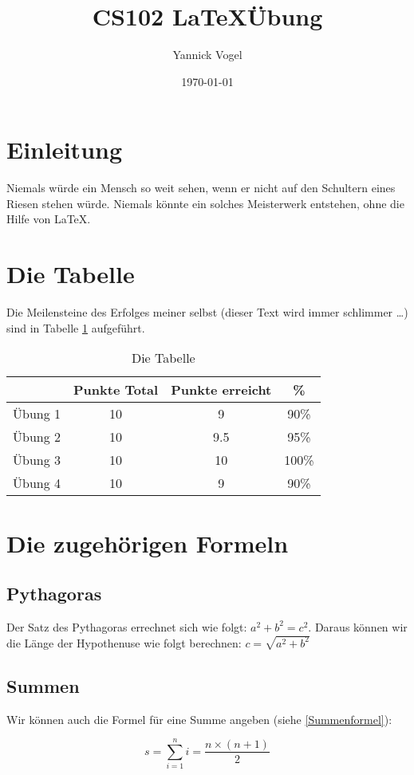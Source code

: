 \documentclass[11pt,a4paper]{article}
\date{\today}
\author{Yannick Vogel}
\title{CS102 \LaTeX Übung}
\begin{document}
\maketitle
\tableofcontents
\section{Einleitung}
Niemals würde ein Mensch so weit sehen, wenn er nicht auf den Schultern eines Riesen stehen würde. Niemals könnte ein solches Meisterwerk entstehen, ohne die Hilfe von \LaTeX .
\section{Die Tabelle}
Die Meilensteine des Erfolges meiner selbst (dieser Text wird immer schlimmer \dots ) sind in Tabelle \ref{tab:DieTabelle} aufgeführt.  

\begin{table}[h]
\centering
\begin{tabular}{c|c|c|c}
{} & Punkte Total & Punkte erreicht & \% \\
\hline
Übung 1 & 10 & 9 & 90\% \\
Übung 2 & 10 & 9.5 & 95\% \\
Übung 3 & 10 & 10 & 100\% \\
Übung 4 & 10 & 9 & 90\% \\
\end{tabular}
\caption{Die Tabelle}
\label{tab:DieTabelle}
\end{table}
\section{Die zugehörigen Formeln}
\subsection{Pythagoras}
Der Satz des Pythagoras errechnet sich wie folgt: $a^2 + b^2 = c^2$. Daraus können
wir die Länge der Hypothenuse wie folgt berechnen: $c = \sqrt{a^2 + b^2}$
\subsection{Summen}
Wir können auch die Formel für eine Summe angeben (siehe \ref{Summenformel}):

\begin{equation}
\label{Summenformel}
s = \sum_{i=1}^{n}i= \frac{n\times(n+1)}{2}
\end{equation}
\end{document}
